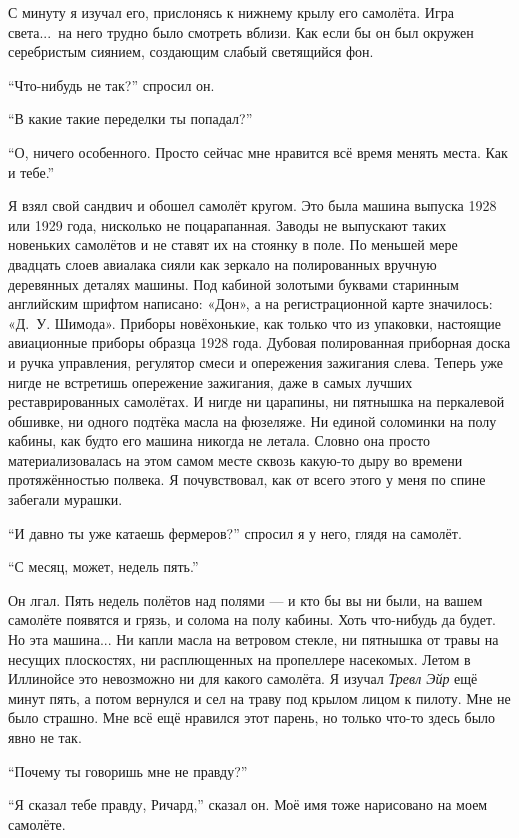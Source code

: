 С минуту я изучал его, прислонясь к нижнему крылу его самолёта. Игра света...\ на него трудно было смотреть вблизи. Как если бы он был окружен серебристым сиянием, создающим слабый светящийся фон.

``Что-нибудь не так?'' спросил он.

``В какие такие переделки ты попадал?''

``О, ничего особенного. Просто сейчас мне нравится всё время менять места. Как и тебе.''

Я взял свой сандвич и обошел самолёт кругом. Это была машина выпуска 1928 или 1929 года, нисколько не
 поцарапанная. Заводы не выпускают таких новеньких самолётов и не ставят их на стоянку в поле. По
 меньшей мере двадцать слоев авиалака сияли как зеркало на полированных вручную деревянных деталях
 машины. Под кабиной золотыми буквами старинным английским шрифтом написано: «Дон», а на регистрационной
 карте значилось: «Д.~У. Шимода». Приборы новёхонькие, как только что из упаковки, настоящие авиационные приборы образца 1928 года. Дубовая полированная приборная доска и ручка управления, регулятор смеси и опережения зажигания слева. Теперь уже нигде не встретишь опережение зажигания, даже в самых лучших реставрированных самолётах. И нигде ни царапины, ни пятнышка на перкалевой обшивке, ни одного подтёка масла на фюзеляже. Ни единой соломинки на полу кабины, как будто его машина никогда не летала. Словно она просто материализовалась на этом самом месте сквозь какую-то дыру во времени протяжённостью полвека. Я почувствовал, как от всего этого у меня по спине забегали мурашки.

``И давно ты уже катаешь фермеров?'' спросил я у него, глядя на самолёт.

``С месяц, может, недель пять.''

Он лгал. Пять недель полётов над полями --- и кто бы вы ни были, на вашем самолёте появятся и
грязь, и солома на полу кабины. Хоть что-нибудь да будет. Но эта машина... Ни капли масла на
ветровом стекле, ни пятнышка от травы на несущих плоскостях, ни расплющенных на пропеллере
насекомых. Летом в Иллинойсе это невозможно ни для какого самолёта. Я изучал {\it Тревл Эйр\/} ещё
минут пять, а потом вернулся и сел на траву под крылом лицом к пилоту. Мне не было страшно. Мне
всё ещё нравился этот парень, но только что-то здесь было явно не так.

``Почему ты говоришь мне не правду?''

``Я сказал тебе правду, Ричард,'' сказал он. Моё имя тоже нарисовано на моем самолёте.

